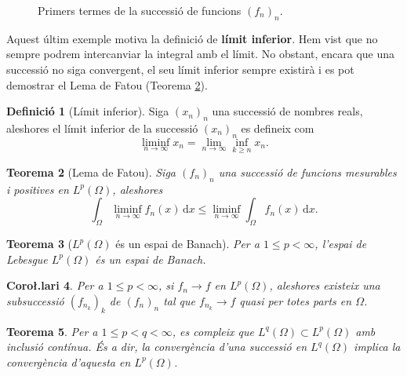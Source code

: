 \documentclass[12pt]{book}
\newtheorem{teorema}{Teorema}[chapter]
\newtheorem{coro}[teorema]{Coro\l.lari}
\theoremstyle{definition}
\newtheorem{defi}[teorema]{Definició}
\theoremstyle{nota}
\theoremstyle{exemple}
\begin{document}
\begin{figure}[htbp]
  \caption{Primers termes de la successió de funcions $(f_n)_n$.}
  \label{fig:exemple-no-conver}
\end{figure}

Aquest últim exemple motiva la definició de \textbf{límit
  inferior}. Hem vist que no sempre podrem intercanviar la integral
amb el límit. No obstant, encara que una successió no siga convergent,
el seu límit inferior sempre existirà i es pot demostrar el Lema de Fatou (Teorema \ref{teo:fatou}).

\begin{defi}[Límit inferior]
  Siga $(x_n)_n$ una successió de nombres reals, aleshores el límit
  inferior de la successió $(x_n)_n$ es defineix com
  \[
    \liminf_{n \to \infty} x_n = \lim_{n \to \infty} \inf_{k \geq n} x_n.
  \]
\end{defi}

\begin{teorema}[Lema de Fatou]\label{teo:fatou}
  Siga $(f_n)_n$ una successió de funcions mesurables i positives en
  $L^p(\Omega)$, aleshores
  \[
    \int_{\Omega} \liminf_{n \to \infty} f_n(x) \, \mathrm{d}x \leq
    \liminf_{n \to \infty} \int_{\Omega} f_n(x) \, \mathrm{d}x.
  \]
\end{teorema}

\begin{teorema}[$L^p(\Omega)$ és un espai de Banach]
  Per a $1 \leq p < \infty$, l'espai de Lebesgue $L^p(\Omega)$ és un
  espai de Banach.
\end{teorema}

\begin{coro}
  Per a $1 \leq p < \infty$, si $f_n \to f$ en $L^p(\Omega)$,
  aleshores existeix una subsuccessió $(f_{n_k})_k$ de $(f_n)_n$ tal
  que $f_{n_k} \to f$ quasi per totes parts en $\Omega$.
\end{coro}

\begin{teorema}
  Per a $1 \leq p < q < \infty$, es compleix que
  $L^q(\Omega) \subset L^p(\Omega)$ amb inclusió contínua. És a dir,
  la convergència d'una successió en $L^q(\Omega)$ implica la
  convergència d'aquesta en $L^p(\Omega)$.
\end{teorema}
\end{document}
